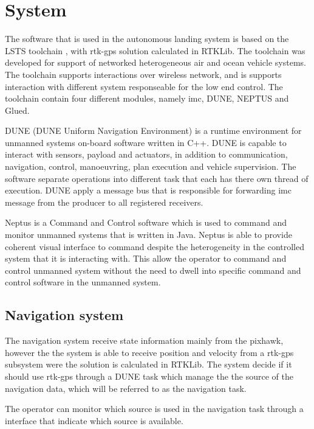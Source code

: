 \chapter{System}
The software that is used in the autonomous landing system is based on the LSTS toolchain \citep{pinto2013lsts}, with \gls{rtk-gps} solution calculated in RTKLib. The toolchain was developed for support of networked heterogeneous air and ocean vehicle systems. The toolchain supports interactions over wireless network, and is supports interaction with different system responseable for the low end control. The toolchain contain four different modules, namely \gls{imc}, DUNE, NEPTUS and Glued.

DUNE (DUNE Uniform Navigation Environment) is a runtime environment for unmanned systems on-board software written in C++. DUNE is capable to interact with sensors, payload and actuators, in addition to communication, navigation, control, manoeuvring, plan execution and vehicle supervision. The software separate operations into different task that each has there own thread of execution. DUNE apply a message bus that is responsible for forwarding \gls{imc} message from the producer to all registered receivers.

Neptus is a Command and Control software which is used to command and monitor unmanned systems that is written in Java. Neptus is able to provide coherent visual interface to command despite the heterogeneity in the controlled system that it is interacting with.  This allow the operator to command and control unmanned system without the need to dwell into specific command and control software in the unmanned system.
\section{Navigation system}
The navigation system receive state information mainly from the pixhawk, however the the system is able to receive position and velocity from a \gls{rtk-gps} subsystem were the solution is calculated in RTKLib. The system decide if it should use \gls{rtk-gps} through a DUNE task which manage the the source of the navigation data, which will be referred to as the navigation task.

The operator can monitor which source is used in the navigation task through a interface that indicate which source is available.
